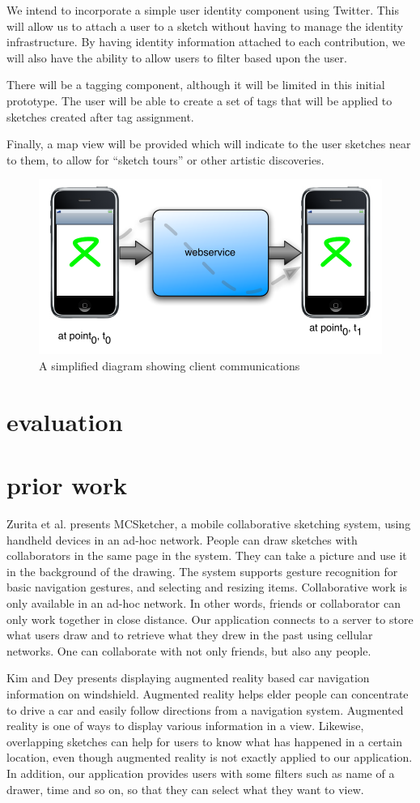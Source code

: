 \documentclass{chi2009}
\begin{document}
We intend to incorporate a simple user identity component using Twitter.  This
will allow us to attach a user to a sketch without having to manage the
identity infrastructure.  By having identity information attached to each
contribution, we will also have the ability to allow users to filter based upon
the user.

There will be a tagging component, although it will be limited in this initial
prototype.  The user will be able to create a set of tags that will be applied
to sketches created after tag assignment.

Finally, a map view will be provided which will indicate to the user sketches
near to them, to allow for ``sketch tours'' or other artistic discoveries.

\begin{figure}
\centering
\includegraphics[width=.45\textwidth]{arch.pdf}
\caption{A simplified diagram showing client communications}
\label{fig:arch}
\end{figure}

\section{evaluation}

\section{prior work}
Zurita et al. \cite{sketching:zurita} presents MCSketcher, a mobile
collaborative sketching system, using handheld devices in an ad-hoc network.
People can draw sketches with collaborators in the same page in the system.
They can take a picture and use it in the background of the drawing. The system
supports gesture recognition for basic navigation gestures, and selecting and
resizing items. Collaborative work is only available in an ad-hoc network. In
other words, friends or collaborator can only work together in close distance.
Our application connects to a server to store what users draw and to retrieve
what they drew in the past using cellular networks. One can collaborate with
not only friends, but also any people.

Kim and Dey \cite{augmented_reality:kim} presents displaying augmented reality
based car navigation information on windshield. Augmented reality helps elder
people can concentrate to drive a car and easily follow directions from a
navigation system. Augmented reality is one of ways to display various
information in a view. Likewise, overlapping sketches can help for users to
know what has happened in a certain location, even though augmented reality is
not exactly applied to our application. In addition, our application provides
users with some filters such as name of a drawer, time and so on, so that they
can select what they want to view.
\end{document}
